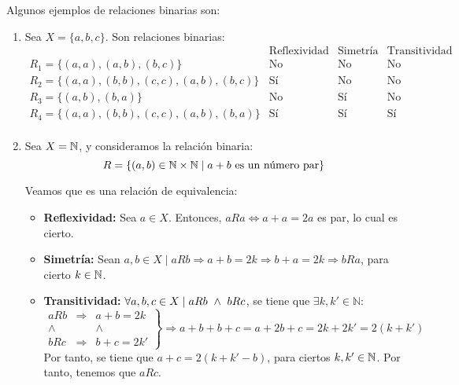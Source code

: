 \begin{ejemplo} Algunos ejemplos de relaciones binarias son:
\begin{enumerate}
    \item Sea $X=\{a,b,c\}$. Son relaciones binarias:
    \begin{equation*}
        \begin{array}{l|ccc}
            & \text{Reflexividad} & \text{Simetría} & \text{Transitividad} \\ \hline
            R_1 = \{(a,a), (a,b), (b,c)\} & \text{No} & \text{No} & \text{No} \\
            R_2 = \{(a,a), (b,b), (c,c), (a,b), (b,c)\} & \text{Sí} & \text{No} & \text{No} \\
            R_3 = \{(a,b), (b,a)\} & \text{No} & \text{Sí} & \text{No} \\
            R_4 = \{(a,a), (b,b), (c,c), (a,b), (b,a)\} & \text{Sí} & \text{Sí} & \text{Sí} \\
        \end{array}
    \end{equation*}

    \item Sea $X=\mathbb{N}$, y consideramos la relación binaria:
    \begin{equation*}
        R=\{(a,b)\in \mathbb{N}\times \mathbb{N} \mid a+b \text{ es un número par}\}
    \end{equation*}

    Veamos que es una relación de equivalencia:
    \begin{itemize}
        \item \textbf{Reflexividad:}  Sea $a\in X$. Entonces, $aRa \Longleftrightarrow a+a=2a$ es par, lo cual es cierto.
        \item \textbf{Simetría:} Sean $a,b \in X \mid aRb\Longrightarrow a+b=2k \Longrightarrow b+a=2k \Longrightarrow bRa$, para cierto $k\in \mathbb{N}$.
        \item \textbf{Transitividad:} $\forall a,b,c \in X \mid aRb \ \land \  bRc$, se tiene que $\exists k,k'\in \mathbb{N}$:
        \begin{equation*}
            \left.\begin{array}{ccc}
                aRb & \Longrightarrow & a+b=2k \\
                \land&&\land\\
                bRc & \Longrightarrow & b+c=2k'
            \end{array} \right\}
            \Longrightarrow a+b+b+c = a+2b+c = 2k + 2k' = 2(k+k')
        \end{equation*}
        Por tanto, se tiene que $a+c=2(k+k'-b)$, para ciertos $k,k'\in \mathbb{N}$. Por tanto, tenemos que $aRc$.
    \end{itemize}


\end{enumerate}
\end{ejemplo}
